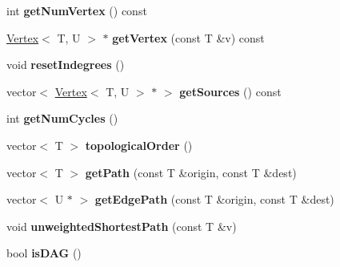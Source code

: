 \begin{DoxyCompactItemize}
\item 
int {\bfseries get\+Num\+Vertex} () const \hypertarget{class_graph_aab190641c754389a1fc7af44db87ce59}{}\label{class_graph_aab190641c754389a1fc7af44db87ce59}

\item 
\hyperlink{class_vertex}{Vertex}$<$ T, U $>$ $\ast$ {\bfseries get\+Vertex} (const T \&v) const \hypertarget{class_graph_ad32c752b1624b345be0392e4f9837378}{}\label{class_graph_ad32c752b1624b345be0392e4f9837378}

\item 
void {\bfseries reset\+Indegrees} ()\hypertarget{class_graph_a10a4b9efc226ad104c9a9ae63c05d140}{}\label{class_graph_a10a4b9efc226ad104c9a9ae63c05d140}

\item 
vector$<$ \hyperlink{class_vertex}{Vertex}$<$ T, U $>$ $\ast$ $>$ {\bfseries get\+Sources} () const \hypertarget{class_graph_a37cbf1db7397a7a86585cf71893694a5}{}\label{class_graph_a37cbf1db7397a7a86585cf71893694a5}

\item 
int {\bfseries get\+Num\+Cycles} ()\hypertarget{class_graph_a7e2ba6fd50364d1e9dfd399e899a9a76}{}\label{class_graph_a7e2ba6fd50364d1e9dfd399e899a9a76}

\item 
vector$<$ T $>$ {\bfseries topological\+Order} ()\hypertarget{class_graph_a5e1558af86d2fa628e0270e3732d6c3f}{}\label{class_graph_a5e1558af86d2fa628e0270e3732d6c3f}

\item 
vector$<$ T $>$ {\bfseries get\+Path} (const T \&origin, const T \&dest)\hypertarget{class_graph_ab39ef1a79016ffdfc5818067be500268}{}\label{class_graph_ab39ef1a79016ffdfc5818067be500268}

\item 
vector$<$ U $\ast$ $>$ {\bfseries get\+Edge\+Path} (const T \&origin, const T \&dest)\hypertarget{class_graph_a3ae01a7537ca9d57974221c2d748c7ee}{}\label{class_graph_a3ae01a7537ca9d57974221c2d748c7ee}

\item 
void {\bfseries unweighted\+Shortest\+Path} (const T \&v)\hypertarget{class_graph_ab7d09dfde91ef847f5b1d8560948fe09}{}\label{class_graph_ab7d09dfde91ef847f5b1d8560948fe09}

\item 
bool {\bfseries is\+D\+AG} ()\hypertarget{class_graph_af6b8a4769cb3cde4c376a7d1d993673d}{}\label{class_graph_af6b8a4769cb3cde4c376a7d1d993673d}


\end{DoxyCompactItemize}
